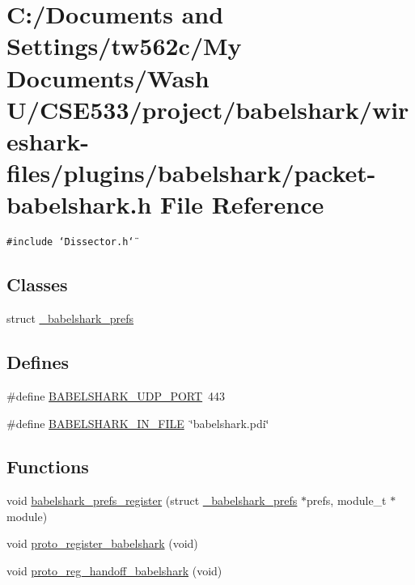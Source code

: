 \hypertarget{packet-babelshark_8h}{
\section{C:/Documents and Settings/tw562c/My Documents/Wash U/CSE533/project/babelshark/wireshark-files/plugins/babelshark/packet-babelshark.h File Reference}
\label{packet-babelshark_8h}
}
{\tt \#include \char`\"{}Dissector.h\char`\"{}}\par
\subsection*{Classes}
\begin{CompactItemize}
\item 
struct \hyperlink{struct__babelshark__prefs}{\_\-babelshark\_\-prefs}
\end{CompactItemize}
\subsection*{Defines}
\begin{CompactItemize}
\item 
\#define \hyperlink{packet-babelshark_8h_2d89c0d071de8d92c8eb4fe1f6541409}{BABELSHARK\_\-UDP\_\-PORT}~443
\item 
\#define \hyperlink{packet-babelshark_8h_a74d255116acf8751ee04f315292cb7e}{BABELSHARK\_\-IN\_\-FILE}~\char`\"{}babelshark.pdi\char`\"{}
\end{CompactItemize}
\subsection*{Functions}
\begin{CompactItemize}
\item 
void \hyperlink{packet-babelshark_8h_a7da879121dfba7477ae8adae7edf144}{babelshark\_\-prefs\_\-register} (struct \hyperlink{struct__babelshark__prefs}{\_\-babelshark\_\-prefs} $\ast$prefs, module\_\-t $\ast$module)
\item 
void \hyperlink{packet-babelshark_8h_da335c2a9b50ba9605c8a5bd5209e50e}{proto\_\-register\_\-babelshark} (void)
\item 
void \hyperlink{packet-babelshark_8h_05f79f4658db9ccfb4172678458b2d21}{proto\_\-reg\_\-handoff\_\-babelshark} (void)
\end{CompactItemize}


